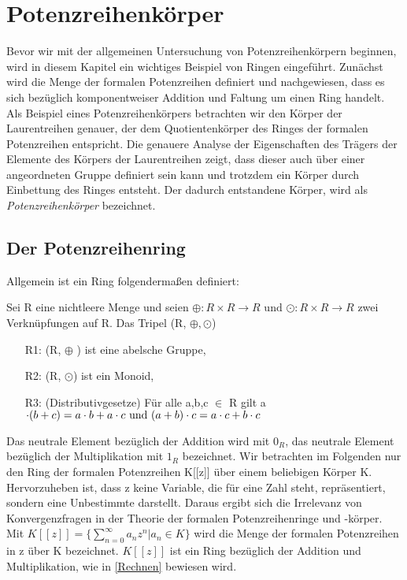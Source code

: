 \chapter{Potenzreihenkörper}\label{chap3}
%
Bevor wir mit der allgemeinen Untersuchung von Potenzreihenkörpern beginnen, wird in diesem Kapitel ein wichtiges Beispiel von Ringen eingeführt. Zunächst wird die Menge der formalen Potenzreihen definiert und nachgewiesen, dass es sich bezüglich komponentweiser Addition und Faltung um einen Ring handelt. Als Beispiel eines Potenzreihenkörpers betrachten wir den Körper der Laurentreihen genauer, der dem Quotientenkörper des Ringes der formalen Potenzreihen entspricht. Die genauere Analyse der Eigenschaften des Trägers der Elemente des Körpers der Laurentreihen zeigt, dass dieser auch über einer angeordneten Gruppe definiert sein kann und trotzdem ein Körper durch Einbettung des Ringes entsteht. Der dadurch entstandene Körper, wird als \textit{Potenzreihenkörper} bezeichnet. \\ 
\section{Der Potenzreihenring}
Allgemein ist ein Ring folgendermaßen definiert:
\begin{defn}\label{Ring} %
\cite{fischer08} Sei R eine nichtleere Menge und seien $\oplus: R \times R \to R \text{ und } \odot: R \times R \to R $ zwei Verknüpfungen auf R. Das Tripel (R, $\oplus, \odot$)
%
\begin{enumerate}
\item[R1:] (R, $\oplus$ ) ist eine abelsche Gruppe,
\item[R2:] (R, $\odot$) ist ein Monoid,
\item[R3:] (Distributivgesetze) Für alle a,b,c $\in$ R gilt a $\cdot(b +c) = a \cdot b + a \cdot c \text{ und } \\
(a+b) \cdot c = a \cdot c + b \cdot c $  
\end{enumerate}
\end{defn}
Das neutrale Element bezüglich der Addition wird mit \textbf{$0_R$}, das neutrale Element bezüglich der Multiplikation mit \textbf{$1_R$} bezeichnet.
%
Wir betrachten im Folgenden nur den Ring der formalen Potenzreihen K[[z]] über einem beliebigen Körper K. Hervorzuheben ist, dass z keine Variable, die für eine Zahl steht, repräsentiert, sondern eine Unbestimmte darstellt. Daraus ergibt sich die Irrelevanz von Konvergenzfragen in der Theorie der formalen Potenzreihenringe und -körper.
Mit $K [[z]] = \lbrace \sum_{n=0}^\infty a_n z^n \vert a_n\in K \rbrace $ wird die Menge der formalen Potenzreihen in z über K bezeichnet. $K [[z]] $ ist ein Ring bezüglich der Addition und Multiplikation, wie in \ref{Rechnen} bewiesen wird. \label{potenzreihenring}

